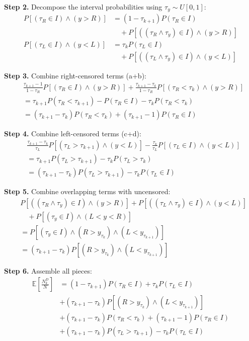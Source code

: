 \documentclass[sigconf]{acmart}
\begin{document}
\textbf{Step 2.} Decompose the interval probabilities using $\tau_y \sim U[0,1]$:
\begin{align*}
P[(\tau_R \in I) \wedge (y > R)] &= (1-\tau_{k+1})P(\tau_R \in I) \\
&\quad + P[((\tau_R \wedge \tau_y) \in I) \wedge (y > R)] \\
P[(\tau_L \in I) \wedge (y < L)] &= \tau_k P(\tau_L \in I) \\
&\quad + P[((\tau_L \wedge \tau_y) \in I) \wedge (y < L)]
\end{align*}

\textbf{Step 3.} Combine right-censored terms (a+b):
\begin{align*}
&\tfrac{\tau_{k+1}-1}{1-\tau_R} P[(\tau_R \in I) \wedge (y > R)] + \tfrac{\tau_{k+1}-\tau_k}{1-\tau_R} P[(\tau_R < \tau_k) \wedge (y > R)] \\
&= \tau_{k+1} P(\tau_R < \tau_{k+1}) - P(\tau_R \in I) - \tau_k P(\tau_R < \tau_k) \\
&= (\tau_{k+1}-\tau_k) P(\tau_R < \tau_k) + (\tau_{k+1}-1) P(\tau_R \in I)
\end{align*}

\textbf{Step 4.} Combine left-censored terms (c+d):
\begin{align*}
&\tfrac{\tau_{k+1}-\tau_k}{\tau_L} P[(\tau_L > \tau_{k+1}) \wedge (y < L)] - \tfrac{\tau_k}{\tau_L} P[(\tau_L \in I) \wedge (y < L)] \\
&= \tau_{k+1} P(\tau_L > \tau_{k+1}) - \tau_k P(\tau_L > \tau_k) \\
&= (\tau_{k+1}-\tau_k) P(\tau_L > \tau_{k+1}) - \tau_k P(\tau_L \in I)
\end{align*}

\textbf{Step 5.} Combine overlapping terms with uncensored:
\begin{align*}
&P[((\tau_R \wedge \tau_y) \in I) \wedge (y > R)] + P[((\tau_L \wedge \tau_y) \in I) \wedge (y < L)] \\
&\quad + P[(\tau_y \in I) \wedge (L < y < R)] \\
&= P[(\tau_y \in I) \wedge (R > y_{\tau_k}) \wedge (L < y_{\tau_{k+1}})] \\
&= (\tau_{k+1}-\tau_k) P[(R > y_{\tau_k}) \wedge (L < y_{\tau_{k+1}})]
\end{align*}

\textbf{Step 6.} Assemble all pieces:
\begin{align*}
\mathbb{E}\left[\frac{N_k^D}{N}\right] &= (1-\tau_{k+1})P(\tau_R \in I) + \tau_k P(\tau_L \in I) \\
&+ (\tau_{k+1}-\tau_k) P[(R > y_{\tau_k}) \wedge (L < y_{\tau_{k+1}})] \\
&+ (\tau_{k+1}-\tau_k) P(\tau_R < \tau_k) + (\tau_{k+1}-1) P(\tau_R \in I) \\
&+ (\tau_{k+1}-\tau_k) P(\tau_L > \tau_{k+1}) - \tau_k P(\tau_L \in I)
\end{align*}
\end{document}
